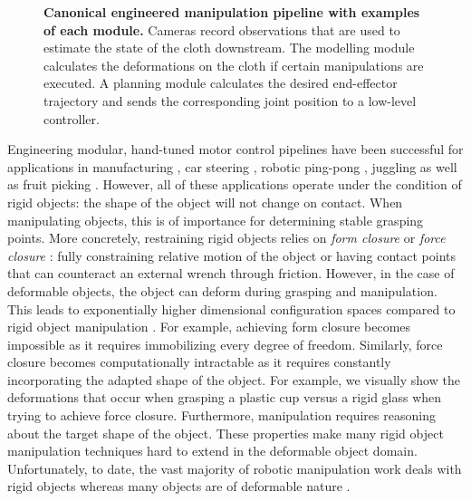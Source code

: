 \begin{figure}[p]
    \centering
    
    \vspace*{-10mm}
    \caption[Canonical engineered manipulation pipeline.]{\textbf{Canonical engineered manipulation pipeline with examples of each module.} Cameras record observations that are used to estimate the state of the cloth downstream. The modelling module calculates the deformations on the cloth if certain manipulations are executed. A planning module calculates the desired end-effector trajectory and sends the corresponding joint position to a low-level controller.
    }
    \label{fig:canonical_robotic_manipulation_engineered_pipeline}
\end{figure}

Engineering modular, hand-tuned motor control pipelines have been successful for applications in manufacturing \autocite{Clocksin1985,Mochizuki1987}, car steering \autocite{Dickmanns1988}, robotic ping-pong \autocite{Andersson1987}, juggling \autocite{Rizzi1993} as well as fruit picking \autocite{Harrell1989}. However, all of these applications operate under the condition of rigid objects: the shape of the object will not change on contact.
When manipulating objects, this is of importance for determining stable grasping points. More concretely, restraining rigid objects relies on \textit{form closure} \autocite{Nguyen1988} or \textit{force closure} \autocite{Bicchi1995}: fully constraining relative motion of the object or having contact points that can counteract an external wrench through friction.
However, in the case of deformable objects, the object can deform during grasping and manipulation. This leads to exponentially higher dimensional configuration spaces compared to rigid object manipulation \autocite{Foresti2004}. For example, achieving form closure becomes impossible as it requires immobilizing every degree of freedom. Similarly, force closure becomes computationally intractable as it requires constantly incorporating the adapted shape of the object. For example, we visually show the deformations that occur when grasping a plastic cup versus a rigid glass when trying to achieve force closure. Furthermore, manipulation requires reasoning about the target shape of the object. These properties make many rigid object manipulation techniques hard to extend in the deformable object domain. Unfortunately, to date, the vast majority of robotic manipulation work deals with rigid objects whereas many objects are of deformable nature \autocite{Siciliano2008}.

